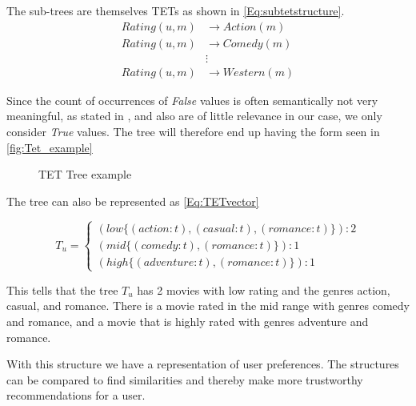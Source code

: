 The sub-trees are themselves TETs as shown in \autoref{Eq:subtetstructure}.
\begin{equation}\label{Eq:subtetstructure}
\begin{aligned}
Rating(u,m)& \longrightarrow Action(m) \\
Rating(u,m)& \longrightarrow Comedy(m)\\
& \vdots \\
Rating(u,m)& \longrightarrow Western(m)
\end{aligned}
\end{equation}

Since the count of occurrences of \textit{False} values is often semantically not very meaningful, as stated in \cite{jaeger2019counts}, and also are of little relevance in our case, we only consider \textit{True} values. The tree will therefore end up having the form seen in \autoref{fig:Tet_example}

\begin{figure}[H]
    \centering
    \begin{adjustbox}{width=0.5\textwidth}
    
    \end{adjustbox}
    \caption{TET Tree example}
    \label{fig:Tet_example}
\end{figure}


The tree can also be represented as \autoref{Eq:TETvector}

\begin{equation}\label{Eq:TETvector}
    T_u=
    \begin{cases}
      (low \{(action:t),(casual:t), (romance:t)\}):2 \\
      (mid \{(comedy:t),(romance:t)\}):1 \\
      (high\{(adventure:t),(romance:t)\}):1
    \end{cases}
\end{equation}

This tells that the tree $T_u$ has 2 movies with low rating and the genres action, casual, and romance. There is a movie rated in the mid range with genres comedy and romance, and a movie that is highly rated with genres adventure and romance.

With this structure we have a representation of user preferences.
The structures can be compared to find similarities and thereby make more trustworthy recommendations for a user.
